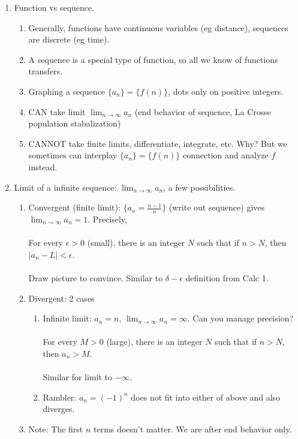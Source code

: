 \documentclass{article}
\newcommand{\ds}{\displaystyle}
\begin{document}
\begin{enumerate}
\item Function vs sequence.
\begin{enumerate}
\item Generally, functions have continuous variables (eg distance), sequences are discrete (eg time).
\item A sequence is a special type of function, so all we know of functions transfers.
\item Graphing a sequence $\{a_n\} = \{f(n)\}$, dots only on positive integers.
\item CAN take limit $\lim_{n\rightarrow \infty} a_n$ (end behavior of sequence, La Crosse population stabalization)
\item CANNOT take finite limits, differentiate, integrate, etc. Why? But we sometimes can interplay $\{a_n\} = \{f(n)\}$ connection and analyze $f$ instead.
\end{enumerate}

\item Limit of a infinite sequence: $\lim_{n\rightarrow \infty} a_n$, a few possibilities.
\begin{enumerate}
\item Convergent (finite limit): $\{a_n = \frac{n-1}{n}\}$ (write out sequence) gives $\ds \lim_{n\rightarrow \infty} a_n = 1$. Precisely, \\ \ \\
For every $\epsilon >0$ (small), there is an integer $N$ such that if $n>N$, then $|a_n-L|<\epsilon$. \\ \ \\
Draw picture to convince. Similar to $\delta-\epsilon$ definition from Calc 1.
\item Divergent: 2 cases
\begin{enumerate}
\item Infinite limit: $a_n = n$, $\ds \lim_{n\rightarrow \infty} a_n=\infty$. Can you manage precision? \\ \ \\
For every $M >0$ (large), there is an integer $N$ such that if $n>N$, then $a_n>M$. \\ \ \\
Similar for limit to $-\infty$.
\item Rambler: $a_n=(-1)^n$ does not fit into either of above and also diverges.
\end{enumerate}
\item Note: The first $n$ terms doesn't matter. We are after end behavior only.
\end{enumerate}


\end{enumerate}
\end{document}
